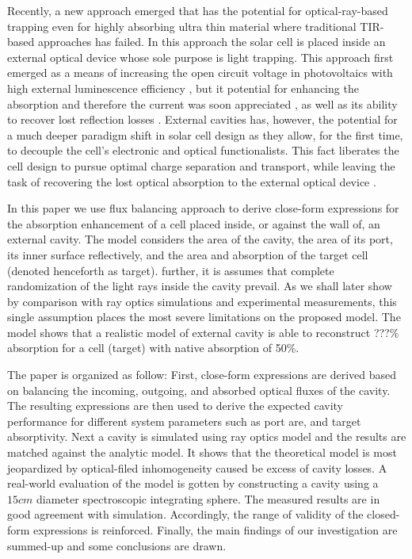 \documentclass[a4paper]{article}
\begin{document}
Recently, a new approach emerged that has the potential for optical-ray-based trapping even for highly absorbing ultra thin material where traditional TIR-based approaches has failed. In this approach the solar cell is placed inside an external optical device whose sole purpose is light trapping. This approach first emerged as a means of increasing the open circuit voltage in photovoltaics with high external luminescence efficiency \cite{Braun2013_external_recycling}, but it potential for enhancing the absorption and therefore the current was soon appreciated \cite{Weinstein2014a,Weinstein2015b,Niv2016a}, as well as its ability to recover lost reflection losses \cite{VanDijk2016a}. External cavities has, however, the potential for a much deeper paradigm shift in solar cell design as they allow, for the first time, to decouple the cell's electronic and optical functionalists. This fact liberates the cell design to pursue optimal charge separation and transport, while leaving the task of recovering the lost optical absorption to the external optical device \cite{VanDijk2016a}. 
\par %
In this paper we use flux balancing approach to derive close-form expressions for the absorption enhancement of a cell placed inside, or against the wall of, an external cavity. The model considers the area of the cavity, the area of its port, its inner surface reflectively, and the area and absorption of the target cell (denoted henceforth as target). further, it is assumes that complete randomization of the light rays inside the cavity prevail. As we shall later show by comparison with ray optics simulations and experimental measurements, this single assumption places the most severe limitations on the proposed model.
The model shows that a realistic model of external cavity is able to reconstruct ???\% absorption for a cell (target) with native absorption of 50\%.
\par %
The paper is organized as follow:
    First, close-form expressions are derived based on balancing the incoming, outgoing, and absorbed optical fluxes of the cavity. The resulting expressions are then used to derive the expected cavity performance for different system parameters such as port are, and target absorptivity.
    Next a cavity is simulated using ray optics model and the results are matched against the analytic model. It shows that the theoretical model is most jeopardized by optical-filed inhomogeneity caused be excess of cavity losses.
    A real-world evaluation of the model is gotten by constructing a cavity using a $15cm$ diameter spectroscopic integrating sphere. The measured results are in good agreement with simulation. Accordingly, the range of validity of the closed-form expressions is reinforced.
    Finally, the main findings of our investigation are summed-up and some conclusions are drawn.
\end{document}

